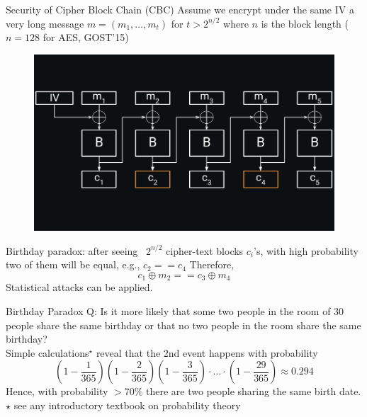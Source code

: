 \documentclass[usenames,dvipsnames, 9pt]{beamer}
\begin{document}
\begin{frame}{Security of Cipher Block Chain (CBC)}
	Assume we encrypt under the same IV a very long message $m=(m_1, \ldots, m_t)$ for $t> 2^{n/2}$ where $n$ is the block length ($n=128$ for AES, GOST'15)
	\vspace{-10pt}
	\begin{figure}
		\includegraphics[width=1\textwidth]{CBC_1}
	\end{figure}
\vspace{-40pt}
{\color{Orange}Birthday paradox:} after seeing ~$2^{n/2}$ cipher-text blocks $c_i$'s, with high probability two of them will be equal, e.g.,  $c_2 == c_4$ Therefore,
\Large
\[
	c_1 \oplus m_2 == c_3 \oplus m_4
\]
Statistical attacks can be applied.
\end{frame}

\begin{frame}{Birthday Paradox}
\Large
	Q: Is it more likely that some two people in the room  of 30 people share the same birthday or that no two people in the room share the same birthday?\\
	\pause
	Simple calculations$^\star$ reveal that the 2nd event happens with probability
	\[
		\left(1 - \frac{1}{365}\right)  \left(1 - \frac{2}{365}\right) \left(1 - \frac{3}{365}\right) \cdot \ldots \cdot \left(1 - \frac{29}{365}\right)  \approx 0.294
	\]
	Hence, with probability $>70\%$ there are two people sharing the same birth date.
	\vfill  {\normalsize $\star$ see any introductory textbook  on probability theory}
\end{frame}
\end{document}
